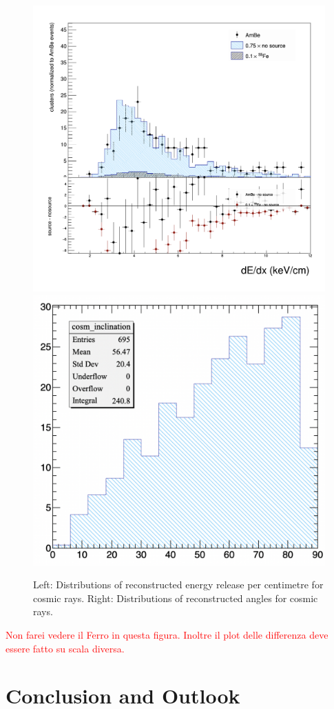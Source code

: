 \documentclass[12pt]{iopart}
\begin{document}
 
 \begin{figure}[ht]
	\centering
	\includegraphics[width=0.45\linewidth]{dEdx_cosmics.png}
	\includegraphics[width=0.45\linewidth]{cosmic_angle.png}
  	\caption{Left: Distributions of reconstructed energy release per centimetre for cosmic rays. Right: Distributions of reconstructed angles for cosmic rays. }
  	\label{fig:cosmics}
\end{figure}
\textcolor{red}{Non farei vedere il Ferro in questa figura. Inoltre il plot delle differenza deve essere fatto su scala diversa. }

 
 \section{Conclusion and Outlook}
 
 
\end{document}
